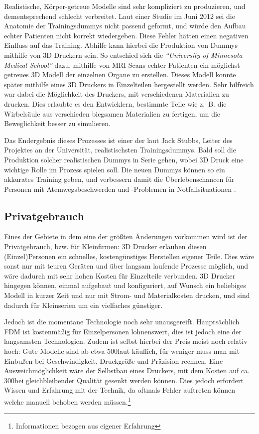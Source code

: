 Realistische, Körper-getreue Modelle sind sehr kompliziert zu produzieren, und dementsprechend schlecht verbreitet. Laut einer Studie im Juni 2012 sei die Anatomie der Trainingsdummys nicht passend geformt, und würde den Aufbau echter Patienten nicht korrekt wiedergeben. Diese Fehler hätten einen negativen Einfluss auf das Training. Abhilfe kann hierbei die Produktion von Dummys mithilfe von 3D Druckern sein. So entschied sich die \emph{\textquotedblleft University of Minnesota Medical School\textquotedblright} dazu, mithilfe von MRI-Scans echter Patienten ein möglichst getreues 3D Modell der einzelnen Organe zu erstellen. Dieses Modell konnte später mithilfe eines 3D Druckers in Einzelteilen hergestellt werden. Sehr hilfreich war dabei die Möglichkeit des Druckers, mit verschiedenen Materialien zu drucken. Dies erlaubte es den Entwicklern, bestimmte Teile wie z.~B. die Wirbelsäule aus verschieden biegsamen Materialien zu fertigen, um die Beweglichkeit besser zu simulieren. 

Das Endergebnis dieses Prozesses ist einer der laut Jack Stubbs, Leiter des Projektes an der Universität, realistischsten Trainingsdummys. Bald soll die Produktion solcher realistischen Dummys in Serie gehen, wobei 3D Druck eine wichtige Rolle im Prozess spielen soll. Die neuen Dummys können so ein akkurates Training geben, und verbessern damit die Überlebenschancen für Personen mit Atemwegsbeschwerden und -Problemen in Notfallsituationen \parencite{DUMMY_STUDY}.


\subsection{Privatgebrauch}

Eines der Gebiete in dem eine der größten Änderungen vorkommen wird ist der Privatgebrauch, bzw. für Kleinfirmen:
3D Drucker erlauben diesen (Einzel)Personen ein schnelles, kostengünstiges Herstellen eigener Teile. Dies wäre sonst nur mit teuren Geräten und über langsam laufende Prozesse möglich, und wäre dadurch mit sehr hohen Kosten für Einzelteile verbunden. 3D Drucker hingegen können, einmal aufgebaut und konfiguriert, auf Wunsch ein beliebiges Modell in kurzer Zeit und nur mit Strom- und Materialkosten drucken, und sind dadurch für Kleinserien um ein vielfaches günstiger. 

Jedoch ist die momentane Technologie noch sehr unausgereift. Hauptsächlich FDM ist kostenmäßig für Einzelpersonen lohnenswert, dies ist jedoch eine der langsamsten Technologien. Zudem ist selbst hierbei der Preis meist noch relativ hoch: Gute Modelle sind ab etwa 500\EURO laut \textcite{TOM_PRINTER} käuflich, für weniger muss man mit Einbußen bei Geschwindigkeit, Druckgröße und Präzision rechnen. Eine Ausweichmöglichkeit wäre der Selbstbau eines Druckers, mit dem Kosten auf ca. 300\EURO bei gleichbleibender Qualität gesenkt werden können. Dies jedoch erfordert Wissen und Erfahrung mit der Technik, da oftmals Fehler auftreten können welche manuell behoben werden müssen.\footnote{Informationen bezogen aus eigener Erfahrung}

